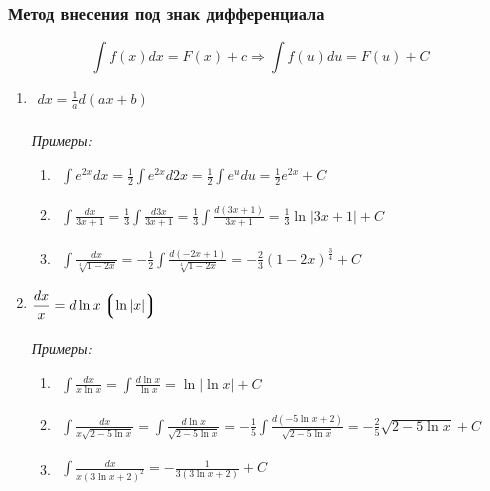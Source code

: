 \documentclass[12pt, fleqn]{book}
\begin{document}
	\subsubsection{Метод внесения под знак дифференциала}
	\begin{equation*}
		\int f(x)dx=F(x)+c \Rightarrow \int f(u)du=F(u)+C
	\end{equation*}
	\begin{enumerate}[1.]
		\item $\begin{gathered}
			dx=\frac{1}{a}d\left(ax+b\right)
		\end{gathered}$\\\\
		\textit{Примеры:}
		\begin{enumerate}[1)]
			\item $\begin{gathered}
				\int e^{2x}dx=\frac{1}{2}\int e^{2x}d2x=\frac{1}{2}\int e^udu=\frac{1}{2}e^{2x}+C
			\end{gathered}$
			\item $\begin{gathered}
				\int \frac{dx}{3x+1}=\frac{1}{3}\int \frac{d3x}{3x+1}=\frac{1}{3}\int \frac{d(3x+1)}{3x+1}=\frac{1}{3}\ln\left|3x+1 \right|+C
			\end{gathered}$
			\item $\begin{gathered}
				\int \frac{dx}{\sqrt[4]{1-2x}}=-\frac{1}{2}\int \frac{d(-2x+1)}{\sqrt[4]{1-2x}}=-\frac{2}{3}\left(1-2x\right)^\frac{3}{4}+C
			\end{gathered}$
		\end{enumerate}
		\item $\begin{gathered}
			\frac{dx}{x}=d\ln x \left\lgroup \ln \left| x\right|\right\rgroup
		\end{gathered}$\\\\
		\textit{Примеры:}
		\begin{enumerate}[1)]
			\item $\begin{gathered}
				\int \frac{dx}{x \ln x}=\int \frac{d \ln x}{\ln x}=\ln\left| \ln x\right| + C
			\end{gathered}$
			\item $\begin{gathered}
				\int \frac{dx}{x\sqrt{2-5\ln x}}=\int \frac{d\ln x}{\sqrt{2-5\ln x}}=-\frac{1}{5}\int \frac{d\left(-5\ln x+2\right)}{\sqrt{2-5\ln x}}=-\frac{2}{5}\sqrt{2-5\ln x} +C
			\end{gathered}$
			\item $\begin{gathered}
				\int \frac{dx}{x\left(3\ln x + 2\right)^2}=-\frac{1}{3\left(3\ln x + 2\right)} + C
			\end{gathered}$
		\end{enumerate}
	\end{enumerate}
\end{document}
